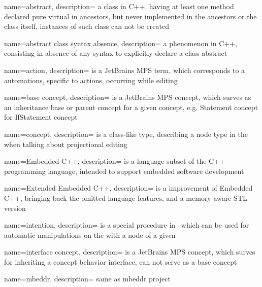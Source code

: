 {
  name=abstract,
  description={ a class in C++, having at least one method declared pure virtual in ancestors, but never implemented in the ancestors or the
  class itself, instances of such class can not be created}
}

{
  name=abstract class syntax absence,
  description={ a phenomenon in C++, consisting in absence of any syntax to explicitly declare a class abstract}
}

{
  name=action,
  description={ is a JetBrains MPS term, which corresponds to a automations, specific to actions, occurring while editing}
}




{
  name=base concept,
  description={ is a JetBrains MPS concept, which surves as an inheritance base or parent concept for a given concept, e.g. Statement concept for IfStatement concept}
}


{
  name=concept,
  description={ is a class-like type, describing a node type in the  when talking about projectional editing}
}




{
  name=Embedded C++,
  description={ is a language subset of the C++ programming language, intended to
  support embedded software development}
}

{
  name=Extended Embedded C++,
  description={ is a improvement of Embedded C++, bringing back the omitted language features, and a memory-aware STL version}
}


{
  name=intention,
  description={ is a special procedure in \jbmps\ which can be used for automatic manipulations on the  with a node of a given }
}

{
  name=interface concept,
  description={ is a JetBrains MPS concept, which surves for inheriting a concept behavior interface, can not serve as a base concept}
}


{
  name=mbeddr,
  description={ same as mbeddr project}
}


